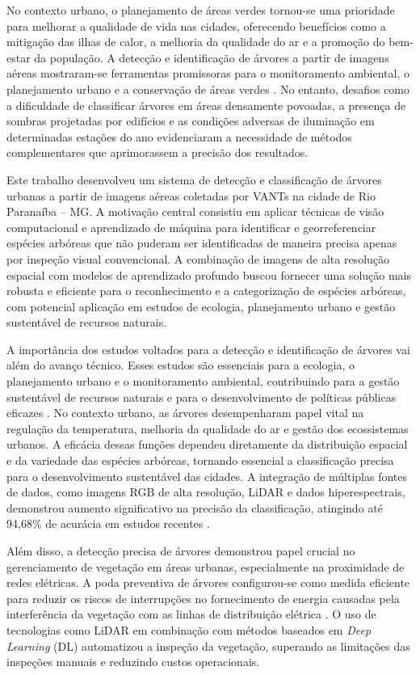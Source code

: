 \documentclass[
    12pt,
    openright,
    oneside,
    a4paper,
    sumario=tradicional,
    english,
    brazil,
    ]{abntex2}
\begin{document}
No contexto urbano, o planejamento de áreas verdes tornou-se uma prioridade para melhorar a qualidade de vida nas cidades, oferecendo benefícios como a mitigação das ilhas de calor, a melhoria da qualidade do ar e a promoção do bem-estar da população. A detecção e identificação de árvores a partir de imagens aéreas mostraram-se ferramentas promissoras para o monitoramento ambiental, o planejamento urbano e a conservação de áreas verdes \cite{herold2019role, f12121736}. No entanto, desafios como a dificuldade de classificar árvores em áreas densamente povoadas, a presença de sombras projetadas por edifícios e as condições adversas de iluminação em determinadas estações do ano evidenciaram a necessidade de métodos complementares que aprimorassem a precisão dos resultados.

Este trabalho desenvolveu um sistema de detecção e classificação de árvores urbanas a partir de imagens aéreas coletadas por VANTs na cidade de Rio Paranaíba -- MG. A motivação central consistiu em aplicar técnicas de visão computacional e aprendizado de máquina para identificar e georreferenciar espécies arbóreas que não puderam ser identificadas de maneira precisa apenas por inspeção visual convencional. A combinação de imagens de alta resolução espacial com modelos de aprendizado profundo buscou fornecer uma solução mais robusta e eficiente para o reconhecimento e a categorização de espécies arbóreas, com potencial aplicação em estudos de ecologia, planejamento urbano e gestão sustentável de recursos naturais.

A importância dos estudos voltados para a detecção e identificação de árvores vai além do avanço técnico. Esses estudos são essenciais para a ecologia, o planejamento urbano e o monitoramento ambiental, contribuindo para a gestão sustentável de recursos naturais e para o desenvolvimento de políticas públicas eficazes \cite{daliakopoulos2009tree}. No contexto urbano, as árvores desempenharam papel vital na regulação da temperatura, melhoria da qualidade do ar e gestão dos ecossistemas urbanos. A eficácia dessas funções dependeu diretamente da distribuição espacial e da variedade das espécies arbóreas, tornando essencial a classificação precisa para o desenvolvimento sustentável das cidades. A integração de múltiplas fontes de dados, como imagens RGB de alta resolução, LiDAR e dados hiperespectrais, demonstrou aumento significativo na precisão da classificação, atingindo até 94,68\% de acurácia em estudos recentes \cite{wu2024fine}.

Além disso, a detecção precisa de árvores demonstrou papel crucial no gerenciamento de vegetação em áreas urbanas, especialmente na proximidade de redes elétricas. A poda preventiva de árvores configurou-se como medida eficiente para reduzir os riscos de interrupções no fornecimento de energia causadas pela interferência da vegetação com as linhas de distribuição elétrica \cite{bergmann2024approach}. O uso de tecnologias como LiDAR em combinação com métodos baseados em \textit{Deep Learning} (DL) automatizou a inspeção da vegetação, superando as limitações das inspeções manuais e reduzindo custos operacionais.
\end{document}
